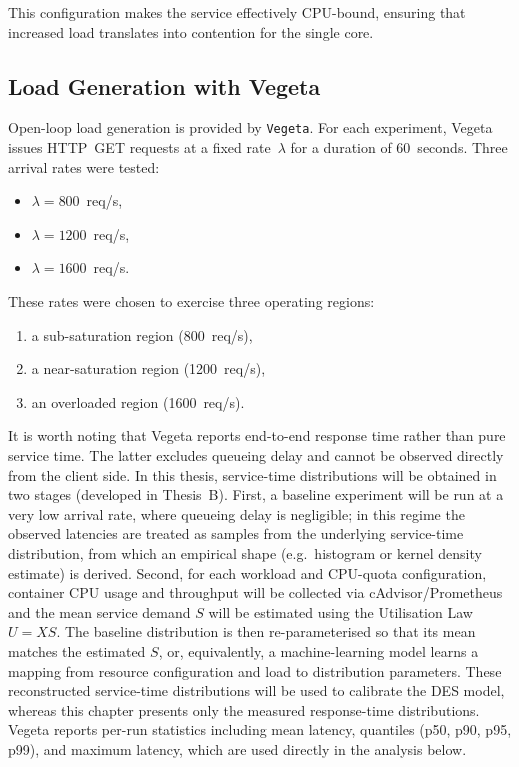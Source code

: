 This configuration makes the service effectively CPU-bound, ensuring
that increased load translates into contention for the single core.

\subsection{Load Generation with Vegeta}

Open-loop load generation is provided by \texttt{Vegeta}. For each
experiment, Vegeta issues HTTP~GET requests at a fixed rate~$\lambda$
for a duration of $60$~seconds. Three arrival rates were tested:

\begin{itemize}
    \item $\lambda = 800$~req/s,
    \item $\lambda = 1200$~req/s,
    \item $\lambda = 1600$~req/s.
\end{itemize}

These rates were chosen to exercise three operating regions:

\begin{enumerate}
    \item a sub-saturation region (800~req/s),
    \item a near-saturation region (1200~req/s),
    \item an overloaded region (1600~req/s).
\end{enumerate}

It is worth noting that Vegeta reports end-to-end response time rather than pure service time. The latter excludes queueing delay and cannot be observed directly from the client side. In this thesis, service-time distributions will be obtained in two stages (developed in Thesis~B). First, a baseline experiment will be run at a very low arrival rate, where queueing delay is negligible; in this regime the observed latencies are treated as samples from the underlying service-time distribution, from which an empirical shape (e.g.\ histogram or kernel density estimate) is derived. Second, for each workload and CPU-quota configuration, container CPU usage and throughput will be collected via cAdvisor/Prometheus and the mean service demand $S$ will be estimated using the Utilisation Law $U = X S$. The baseline distribution is then re-parameterised so that its mean matches the estimated $S$, or, equivalently, a machine-learning model learns a mapping from resource configuration and load to distribution parameters. These reconstructed service-time distributions will be used to calibrate the DES model, whereas this chapter presents only the measured response-time distributions.
Vegeta reports per-run statistics including mean latency, quantiles
(p50, p90, p95, p99), and maximum latency, which are used directly in
the analysis below.

